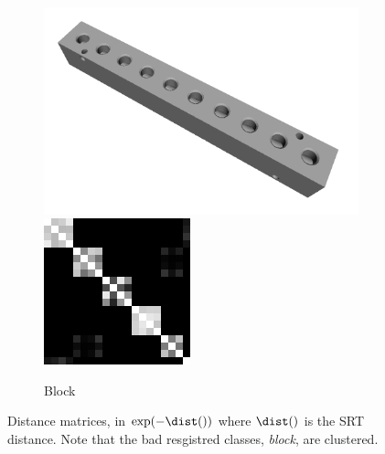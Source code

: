 \begin{figure}[ht]
\begin{subfigure}[b]{0.23\linewidth}
		\includegraphics[width=\linewidth]{fig/3dreg/block.png} \\
		\includegraphics[width=\linewidth]{fig/3dreg/reg3Dtrain_block.png} 
		\caption{Block}
	\end{subfigure}
	\caption{Distance matrices, in $\exp(-\dist())$ where $\dist()$ is the SRT distance. Note that the bad resgistred classes, \eg \emph{block}, are clustered.}
	\label{fig:3dreg_srtmatrices}
\end{figure}

